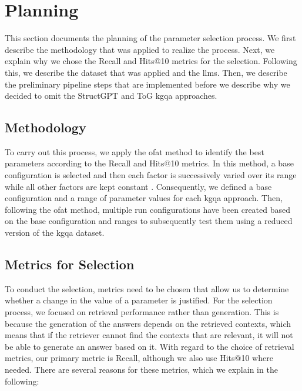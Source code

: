 
\section{Planning}
\label{sec:selection_planning}

This section documents the planning of the parameter selection process. We first describe the methodology that was applied to realize the process. Next, we explain why we chose the Recall and Hits@10 metrics for the selection. Following this, we describe the dataset that was applied and the \glspl{llm}. Then, we describe the preliminary pipeline steps that are implemented before we describe why we decided to omit the StructGPT and ToG \gls{kgqa} approaches.

\subsection{Methodology}
\label{sec:selection_planning_methodology}

To carry out this process, we apply the \gls{ofat} method to identify the best parameters according to the Recall and Hits@10 metrics. In this method, a base configuration is selected and then each factor is successively varied over its range while all other factors are kept constant \cite{montgomery_design_2017}. Consequently, we defined a base configuration and a range of parameter values for each \gls{kgqa} approach. Then, following the \gls{ofat} method, multiple run configurations have been created based on the base configuration and ranges to subsequently test them using a reduced version of the \gls{kgqa} dataset.


\subsection{Metrics for Selection}
\label{sec:selecting_tuning_metric}

To conduct the selection, metrics need to be chosen that allow us to determine whether a change in the value of a parameter is justified. For the selection process, we focused on retrieval performance rather than generation. This is because the generation of the answers depends on the retrieved contexts, which means that if the retriever cannot find the contexts that are relevant, it will not be able to generate an answer based on it. With regard to the choice of retrieval metrics, our primary metric is Recall, although we also use Hits@10 where needed. There are several reasons for these metrics, which we explain in the following:

